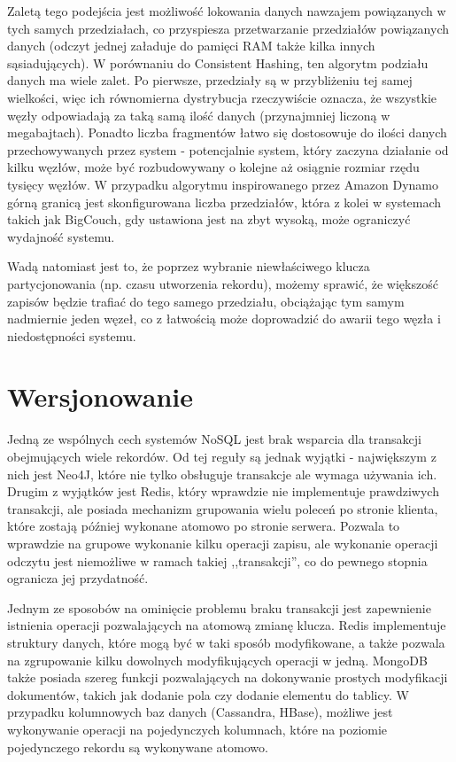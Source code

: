Zaletą tego podejścia jest możliwość lokowania danych nawzajem powiązanych w tych samych przedziałach, co przyspiesza przetwarzanie przedziałów powiązanych danych (odczyt jednej załaduje do pamięci RAM także kilka innych sąsiadujących).
W porównaniu do Consistent Hashing, ten algorytm podziału danych ma wiele zalet.
Po pierwsze, przedziały są w przybliżeniu tej samej wielkości, więc ich równomierna dystrybucja rzeczywiście oznacza, że wszystkie węzły odpowiadają za taką samą ilość danych (przynajmniej liczoną w megabajtach).
Ponadto liczba fragmentów łatwo się dostosowuje do ilości danych przechowywanych przez system - potencjalnie system, który zaczyna działanie od kilku węzłów, może być rozbudowywany o kolejne aż osiągnie rozmiar rzędu tysięcy węzłów.
W przypadku algorytmu inspirowanego przez Amazon Dynamo górną granicą jest skonfigurowana liczba przedziałów, która z kolei w systemach takich jak BigCouch, gdy ustawiona jest na zbyt wysoką, może ograniczyć wydajność systemu.

Wadą natomiast jest to, że poprzez wybranie niewłaściwego klucza partycjonowania (np. czasu utworzenia rekordu), możemy sprawić, że większość zapisów będzie trafiać do tego samego przedziału, obciążając tym samym nadmiernie jeden węzeł, co z łatwością może doprowadzić do awarii tego węzła i niedostępności systemu.

\section{Wersjonowanie}

Jedną ze wspólnych cech systemów NoSQL jest brak wsparcia dla transakcji obejmujących wiele rekordów.
Od tej reguły są jednak wyjątki - największym z nich jest Neo4J, które nie tylko obsługuje transakcje ale wymaga używania ich.
Drugim z wyjątków jest Redis, który wprawdzie nie implementuje prawdziwych transakcji, ale posiada mechanizm grupowania wielu poleceń po stronie klienta, które zostają później wykonane atomowo po stronie serwera.
Pozwala to wprawdzie na grupowe wykonanie kilku operacji zapisu, ale wykonanie operacji odczytu jest niemożliwe w ramach takiej ,,transakcji'', co do pewnego stopnia ogranicza jej przydatność.

Jednym ze sposobów na ominięcie problemu braku transakcji jest zapewnienie istnienia operacji pozwalających na atomową zmianę klucza.
Redis implementuje struktury danych, które mogą być w taki sposób modyfikowane, a także pozwala na zgrupowanie kilku dowolnych modyfikujących operacji w jedną.
MongoDB także posiada szereg funkcji pozwalających na dokonywanie prostych modyfikacji dokumentów, takich jak dodanie pola czy dodanie elementu do tablicy.
W przypadku kolumnowych baz danych (Cassandra, HBase), możliwe jest wykonywanie operacji na pojedynczych kolumnach, które na poziomie pojedynczego rekordu są wykonywane atomowo.

